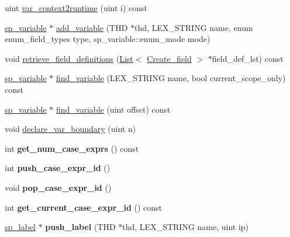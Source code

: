 \begin{DoxyCompactItemize}
\item 
uint \mbox{\hyperlink{classsp__pcontext_a91b66fbcd41167516ec4486c5b1e4b43}{var\+\_\+context2runtime}} (uint i) const
\item 
\mbox{\hyperlink{classsp__variable}{sp\+\_\+variable}} $\ast$ \mbox{\hyperlink{classsp__pcontext_a720325b7d8acd08f7ed7701c8befb6ec}{add\+\_\+variable}} (T\+HD $\ast$thd, L\+E\+X\+\_\+\+S\+T\+R\+I\+NG name, enum enum\+\_\+field\+\_\+types type, sp\+\_\+variable\+::enum\+\_\+mode mode)
\item 
void \mbox{\hyperlink{classsp__pcontext_ab7f7fdb12f7e3c0e9cfea81e4ee39c66}{retrieve\+\_\+field\+\_\+definitions}} (\mbox{\hyperlink{classList}{List}}$<$ \mbox{\hyperlink{classCreate__field}{Create\+\_\+field}} $>$ $\ast$field\+\_\+def\+\_\+lst) const
\item 
\mbox{\hyperlink{classsp__variable}{sp\+\_\+variable}} $\ast$ \mbox{\hyperlink{classsp__pcontext_aa87f03211c0a7efcbf5df3a40471a599}{find\+\_\+variable}} (L\+E\+X\+\_\+\+S\+T\+R\+I\+NG name, bool current\+\_\+scope\+\_\+only) const
\item 
\mbox{\hyperlink{classsp__variable}{sp\+\_\+variable}} $\ast$ \mbox{\hyperlink{classsp__pcontext_a4f3c91318b30516be1b5326df02ab38d}{find\+\_\+variable}} (uint offset) const
\item 
void \mbox{\hyperlink{classsp__pcontext_a480a92643ee11341486f2ed2aec31593}{declare\+\_\+var\+\_\+boundary}} (uint n)
\item 
\mbox{\label{classsp__pcontext_a2a097cbbff8d18ca5ad32ec5bab8fa76}} 
int {\bfseries get\+\_\+num\+\_\+case\+\_\+exprs} () const
\item 
\mbox{\label{classsp__pcontext_a4878c45987da9a7b5503ea3703c33f5a}} 
int {\bfseries push\+\_\+case\+\_\+expr\+\_\+id} ()
\item 
\mbox{\label{classsp__pcontext_a4dece7ec7dfe72bdc7563ec1e59afb38}} 
void {\bfseries pop\+\_\+case\+\_\+expr\+\_\+id} ()
\item 
\mbox{\label{classsp__pcontext_a0cbd4dbc36f81d2e9c257db85df1dc4b}} 
int {\bfseries get\+\_\+current\+\_\+case\+\_\+expr\+\_\+id} () const
\item 
\mbox{\label{classsp__pcontext_ade6f3e4779c4fa3991dff527ed2d2047}} 
\mbox{\hyperlink{classsp__label}{sp\+\_\+label}} $\ast$ {\bfseries push\+\_\+label} (T\+HD $\ast$thd, L\+E\+X\+\_\+\+S\+T\+R\+I\+NG name, uint ip)

\end{DoxyCompactItemize}
